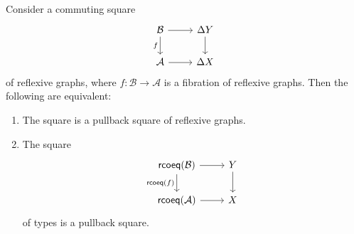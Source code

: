 \begin{comment}
\begin{thm}\label{thm:descent_rcoeq}
Consider a reflexive graph morphism $h:\mathsf{rGph}(\mathcal{A},\Delta X)$. If $h$ is a reflexive coequalizer, then the map
\begin{equation*}
h^\ast : \Big(\sm{Y:\UU}Y\to X\Big)\to \Big(\sm{\mathcal{B}:\mathsf{rGph}}\mathsf{fib\usc{}rGph}(\mathcal{B},\mathcal{A})\Big)
\end{equation*}
is an equivalence. \marginnote{To prove}
\end{thm}

\begin{cor}\label{cor:descent_rcoeq}
For an cartesian morphism $f:\mathsf{rGph}(\mathcal{B},\mathcal{A})$ of reflexive graphs, the type of maps $g:X\to \mathsf{rcoeq}(\mathcal{A})$ equipped with a morphism $h:\mathsf{rGph}(\mathcal{B},\Delta X)$ and an identification witnessing that the square
\begin{equation*}
\begin{tikzcd}
\mathcal{B} \arrow[d,swap,"f"] \arrow[r,"h"] & \Delta X \arrow[d,"\Delta g"] \\
\mathcal{A} \arrow[r,swap,"\mathsf{constr}"] & \Delta(\mathsf{rcoeq}(\mathcal{A}))
\end{tikzcd}
\end{equation*}
of reflexive graph morphisms commutes, is contractible.
\end{cor}
\end{comment}

\begin{thm}\label{thm:rcoeq_cartesian}
Consider a commuting square
\begin{equation}\label{eq:rcoeq_descent}
\begin{tikzcd}
\mathcal{B} \arrow[r] \arrow[d,swap,"f"] & \Delta Y \arrow[d] \\
\mathcal{A} \arrow[r] & \Delta X 
\end{tikzcd}
\end{equation}
of reflexive graphs, where $f:\mathcal{B}\to\mathcal{A}$ is a fibration of reflexive graphs. Then the following are equivalent:
\begin{enumerate}
\item The square is a pullback square of reflexive graphs.
\item The square
\begin{equation*}
\begin{tikzcd}
\mathsf{rcoeq}(\mathcal{B}) \arrow[r] \arrow[d,swap,"\mathsf{rcoeq}(f)"] & Y \arrow[d] \\
\mathsf{rcoeq}(\mathcal{A}) \arrow[r] & X 
\end{tikzcd}
\end{equation*}
of types is a pullback square.
\end{enumerate}
\end{thm}

